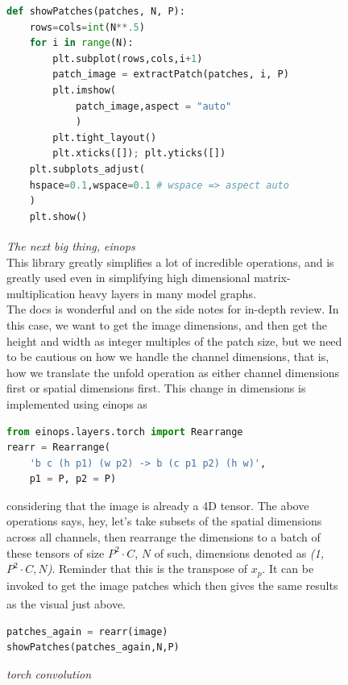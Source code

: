 \documentclass[12pt]{article}
\newcommand{\customtext}[3]{%
    \vspace{#2} %
    \fontsize{13}{8}\textcolor{#1}{\textit{#3}}%
}
\newcommand{\sidecite}[1]{\textsuperscript{\textcolor{blue}{\textbf{\scriptsize#1}}}}
\newcommand{\customtitle}[1]{\fontsize{14}{8}\textcolor{xtitle}{\textit{#1}}\\}
\newcommand{\maincitecount}{\sidecite{\stepcounter{maincite}\themaincite}}
\begin{document}
\begin{figure}[!htb]
\begin{minipage}[t]{.4\textwidth}
\begin{lstlisting}[language=python,style=python,basicstyle=\ttfamily\tiny]
def showPatches(patches, N, P):
    rows=cols=int(N**.5)
    for i in range(N):
        plt.subplot(rows,cols,i+1)
        patch_image = extractPatch(patches, i, P)
        plt.imshow(
            patch_image,aspect = "auto"
            )
        plt.tight_layout()
        plt.xticks([]); plt.yticks([])
    plt.subplots_adjust(
    hspace=0.1,wspace=0.1 # wspace => aspect auto
    )
    plt.show()
\end{lstlisting}
\end{minipage}
\end{figure}
\pagebreak
\begin{figure}[!htb]
\begin{minipage}[t]{0.65\textwidth}
\raggedright
\customtext{xtitle}{0em}{The next big thing, einops\maincitecount}\\
This library greatly simplifies a lot of incredible operations, and is 
greatly used even in simplifying high dimensional matrix-multiplication 
heavy layers in many model graphs.\\
The docs is wonderful and on the side notes for in-depth review. 
In this case, we want to get the image dimensions, and then get the 
height and width as integer multiples of the patch size, but we need to 
be cautious on how we handle the channel dimensions, that is, how we translate 
the unfold operation as either channel dimensions first or spatial dimensions
first.
    This change in dimensions is implemented using einops as     
\begin{lstlisting}[language=python,style=python,basicstyle=\ttfamily\footnotesize]
from einops.layers.torch import Rearrange
rearr = Rearrange(
    'b c (h p1) (w p2) -> b (c p1 p2) (h w)', 
    p1 = P, p2 = P)
\end{lstlisting}
considering that the image is already a {4D} tensor. The above operations says,
hey, let's take subsets of the spatial dimensions across all channels, then 
rearrange the dimensions to a batch of these tensors of size {\small$P^2\cdot C$},
$N$ of such, dimensions denoted as {\it (1,$P^2\cdot C,N$)}. 
Reminder that this is the transpose of $x_p$. It can be invoked to get the image 
patches which then gives the same results as the visual just above.\maincitecount
\begin{lstlisting}[language=python,style=python,basicstyle=\ttfamily\footnotesize]
patches_again = rearr(image)
showPatches(patches_again,N,P)
\end{lstlisting}
\customtitle{torch convolution}

\end{minipage}
\end{figure}
\end{document}

